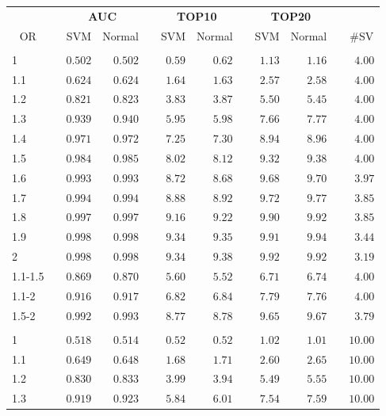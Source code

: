 \documentclass{article}\usepackage[]{graphicx}\usepackage[]{color}
\begin{document}
%
\begin{table}[H]
\begin{center}
\begin{tabular}{lcrrcrrcrrcr}
\hline\hline
\multicolumn{1}{c}{\bfseries }&\multicolumn{1}{c}{\bfseries }&\multicolumn{2}{c}{\bfseries AUC}&\multicolumn{1}{c}{\bfseries }&\multicolumn{2}{c}{\bfseries TOP10}&\multicolumn{1}{c}{\bfseries }&\multicolumn{2}{c}{\bfseries TOP20}&\multicolumn{1}{c}{\bfseries }&\multicolumn{1}{c}{\bfseries }\tabularnewline
\cline{1-12}
\multicolumn{1}{c}{OR}&\multicolumn{1}{c}{}&\multicolumn{1}{c}{SVM}&\multicolumn{1}{c}{Normal}&\multicolumn{1}{c}{}&\multicolumn{1}{c}{SVM}&\multicolumn{1}{c}{Normal}&\multicolumn{1}{c}{}&\multicolumn{1}{c}{SVM}&\multicolumn{1}{c}{Normal}&\multicolumn{1}{c}{}&\multicolumn{1}{c}{\#SV}\tabularnewline
\hline
&&&&&&&&&&&\tabularnewline
1&&$0.502$&$0.502$&&$0.59$&$0.62$&&$1.13$&$1.16$&&$ 4.00$\tabularnewline
1.1&&$0.624$&$0.624$&&$1.64$&$1.63$&&$2.57$&$2.58$&&$ 4.00$\tabularnewline
1.2&&$0.821$&$0.823$&&$3.83$&$3.87$&&$5.50$&$5.45$&&$ 4.00$\tabularnewline
1.3&&$0.939$&$0.940$&&$5.95$&$5.98$&&$7.66$&$7.77$&&$ 4.00$\tabularnewline
1.4&&$0.971$&$0.972$&&$7.25$&$7.30$&&$8.94$&$8.96$&&$ 4.00$\tabularnewline
1.5&&$0.984$&$0.985$&&$8.02$&$8.12$&&$9.32$&$9.38$&&$ 4.00$\tabularnewline
1.6&&$0.993$&$0.993$&&$8.72$&$8.68$&&$9.68$&$9.70$&&$ 3.97$\tabularnewline
1.7&&$0.994$&$0.994$&&$8.88$&$8.92$&&$9.72$&$9.77$&&$ 3.85$\tabularnewline
1.8&&$0.997$&$0.997$&&$9.16$&$9.22$&&$9.90$&$9.92$&&$ 3.85$\tabularnewline
1.9&&$0.998$&$0.998$&&$9.34$&$9.35$&&$9.91$&$9.94$&&$ 3.44$\tabularnewline
2&&$0.998$&$0.998$&&$9.34$&$9.38$&&$9.92$&$9.92$&&$ 3.19$\tabularnewline
1.1-1.5&&$0.869$&$0.870$&&$5.60$&$5.52$&&$6.71$&$6.74$&&$ 4.00$\tabularnewline
1.1-2&&$0.916$&$0.917$&&$6.82$&$6.84$&&$7.79$&$7.76$&&$ 4.00$\tabularnewline
1.5-2&&$0.992$&$0.993$&&$8.77$&$8.78$&&$9.65$&$9.67$&&$ 3.79$\tabularnewline
\hline
&&&&&&&&&&&\tabularnewline
1&&$0.518$&$0.514$&&$0.52$&$0.52$&&$1.02$&$1.01$&&$10.00$\tabularnewline
1.1&&$0.649$&$0.648$&&$1.68$&$1.71$&&$2.60$&$2.65$&&$10.00$\tabularnewline
1.2&&$0.830$&$0.833$&&$3.99$&$3.94$&&$5.49$&$5.55$&&$10.00$\tabularnewline
1.3&&$0.919$&$0.923$&&$5.84$&$6.01$&&$7.54$&$7.59$&&$10.00$\tabularnewline

\end{tabular}
\end{center}
\end{table}
\end{document}
